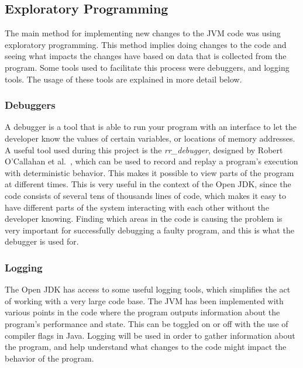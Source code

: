 

\subsection{Exploratory Programming}
The main method for implementing new changes to the JVM code was using exploratory programming. This method implies doing changes to the code and seeing what impacts the changes have based on data that is collected from the program. Some tools used to facilitate this process were debuggers, and logging tools. The usage of these tools are explained in more detail below.
\subsubsection{Debuggers}
A debugger is a tool that is able to run your program with an interface to let the developer know the values of certain variables, or locations of memory addresses. A useful tool used during this project is the \textit{rr\_debugger}, designed by Robert O'Callahan et al.~\cite{rrdebugger}, which can be used to record and replay a program's execution with deterministic behavior. This makes it possible to view parts of the program at different times. This is very useful in the context of the Open JDK, since the code consists of several tens of thousands lines of code, which makes it easy to have different parts of the system interacting with each other without the developer knowing. Finding which areas in the code is causing the problem is very important for successfully debugging a faulty program, and this is what the debugger is used for.

\subsubsection{Logging}
The Open JDK has access to some useful logging tools, which simplifies the act of working with a very large code base. The JVM has been implemented with various points in the code where the program outputs information about the program's performance and state. This can be toggled on or off with the use of compiler flags in Java. Logging will be used in order to gather information about the program, and help understand what changes to the code might impact the behavior of the program.

